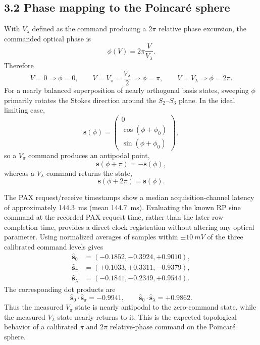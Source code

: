 \documentclass[10pt]{article}
\newcommand{\vect}[1]{\bm{#1}}
\newcommand{\unitstokes}[1]{\widehat{\vect{s}}_{#1}}
\begin{document}
\subsection*{3.2 Phase mapping to the Poincar\'e sphere}
With $V_\lambda$ defined as the command producing a $2\pi$ relative phase excursion, the commanded optical phase is
\begin{equation}
\boxed{\phi(V)=2\pi\frac{V}{V_\lambda}.}
\end{equation}
Therefore
\begin{equation}
V=0\Rightarrow\phi=0,\qquad
V=V_\pi=\frac{V_\lambda}{2}\Rightarrow\phi=\pi,\qquad
V=V_\lambda\Rightarrow\phi=2\pi.
\end{equation}
For a nearly balanced superposition of nearly orthogonal basis states, sweeping $\phi$ primarily rotates the Stokes direction around the $S_2$--$S_3$ plane. In the ideal limiting case,
\begin{equation}
\vect{s}(\phi)=
\begin{pmatrix}
0\\
\cos(\phi+\phi_0)\\
\sin(\phi+\phi_0)
\end{pmatrix},
\label{eq:greatcircle}
\end{equation}
so a $V_\pi$ command produces an antipodal point,
\begin{equation}
\vect{s}(\phi+\pi)=-\vect{s}(\phi),
\end{equation}
whereas a $V_\lambda$ command returns the state,
\begin{equation}
\vect{s}(\phi+2\pi)=\vect{s}(\phi).
\end{equation}

The PAX request/receive timestamps show a median acquisition-channel latency of approximately \SI{144.3}{ms} (mean \SI{144.7}{ms}). Evaluating the known RP sine command at the recorded PAX request time, rather than the later row-completion time, provides a direct clock registration without altering any optical parameter. Using normalized averages of samples within $\pm\SI{10}{mV}$ of the three calibrated command levels gives
\begin{align*}
\unitstokes{0}&=(-0.1852,-0.3924,+0.9010),\\
\unitstokes{\pi}&=(+0.1033,+0.3311,-0.9379),\\
\unitstokes{\lambda}&=(-0.1841,-0.2349,+0.9544).
\end{align*}
The corresponding dot products are
\begin{equation}
\boxed{\unitstokes{0}\cdot\unitstokes{\pi}=-0.9941,\qquad
\unitstokes{0}\cdot\unitstokes{\lambda}=+0.9862.}
\end{equation}
Thus the measured $V_\pi$ state is nearly antipodal to the zero-command state, while the measured $V_\lambda$ state nearly returns to it. This is the expected topological behavior of a calibrated $\pi$ and $2\pi$ relative-phase command on the Poincar\'e sphere.
\end{document}
